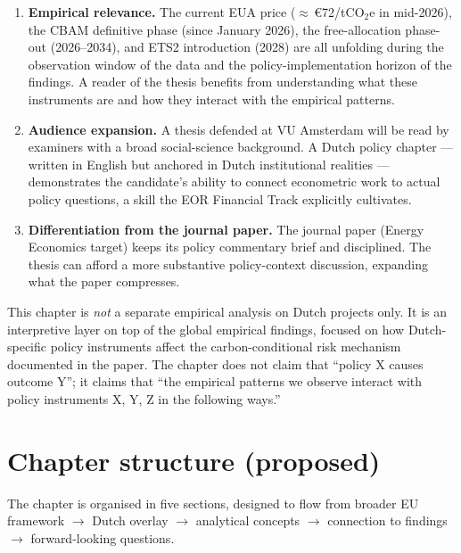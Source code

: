 \documentclass[11pt,a4paper]{article}
\begin{document}
\begin{enumerate}
  \item \textbf{Empirical relevance.} The current EUA price ($\approx \!\!\,$\euro 72/tCO$_2$e in mid-2026), the CBAM definitive phase (since January 2026), the free-allocation phase-out (2026--2034), and ETS2 introduction (2028) are all unfolding during the observation window of the data and the policy-implementation horizon of the findings. A reader of the thesis benefits from understanding what these instruments are and how they interact with the empirical patterns.
  \item \textbf{Audience expansion.} A thesis defended at VU Amsterdam will be read by examiners with a broad social-science background. A Dutch policy chapter --- written in English but anchored in Dutch institutional realities --- demonstrates the candidate's ability to connect econometric work to actual policy questions, a skill the EOR Financial Track explicitly cultivates.
  \item \textbf{Differentiation from the journal paper.} The journal paper (Energy Economics target) keeps its policy commentary brief and disciplined. The thesis can afford a more substantive policy-context discussion, expanding what the paper compresses.
\end{enumerate}

\begin{rationale}
This chapter is \emph{not} a separate empirical analysis on Dutch projects only. It is an interpretive layer on top of the global empirical findings, focused on how Dutch-specific policy instruments affect the carbon-conditional risk mechanism documented in the paper. The chapter does not claim that ``policy X causes outcome Y''; it claims that ``the empirical patterns we observe interact with policy instruments X, Y, Z in the following ways.''
\end{rationale}

\newpage

\section{Chapter structure (proposed)}

The chapter is organised in five sections, designed to flow from broader EU framework $\to$ Dutch overlay $\to$ analytical concepts $\to$ connection to findings $\to$ forward-looking questions.
\end{document}
